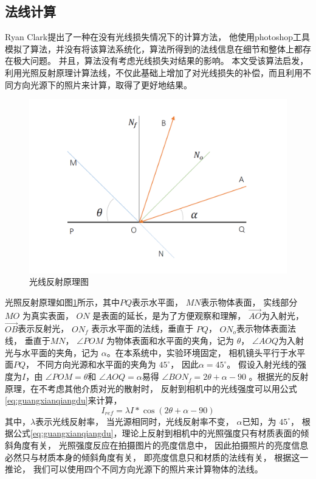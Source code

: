 \subsection{法线计算}


 Ryan Clark\cite{zarria.net}提出了一种在没有光线损失情况下的计算方法，
 他使用photoshop工具模拟了算法，并没有将该算法系统化，算法所得到的法线信息在细节和整体上都存在极大问题。
 并且，算法没有考虑光线损失对结果的影响。
 本文受该算法启发，利用光照反射原理计算法线，不仅此基础上增加了对光线损失的补偿，而且利用不同方向光源下的照片来计算，取得了更好地结果。

\begin{figure}[htbp]
\centering
\includegraphics[width=0.8\linewidth]{figures/guangxianfanshetu.png}
\caption{光线反射原理图}
\label{fig:guangxianfanshetu}
\end{figure}

光照反射原理如图\ref{fig:guangxianfanshetu}所示，其中$PQ$表示水平面，
$MN$表示物体表面，
实线部分$MO$
为真实表面，
$ON$
是表面的延长，是为了方便观察和理解，
$\overrightarrow{AO}$为入射光，
$\overrightarrow{OB}$表示反射光，
$ON_f$
表示水平面的法线，垂直于
$PQ$，
$ON_o$表示物体表面法线，
垂直于$MN$，
$\angle POM$
为物体表面和水平面的夹角，记为
$\theta $，
$\angle AOQ$为入射光与水平面的夹角，记为
$\alpha$。在本系统中，实验环境固定，
相机镜头平行于水平面$PQ$，
不同方向光源和水平面的夹角为
$45^{\circ}$，
因此$\alpha=45^{\circ}$。
假设入射光线的强度为$I$，由
$\angle POM=\theta$和
$\angle AOQ=\alpha$易得
$\angle {BON}_f=2\theta+\alpha-90$
。根据光的反射原理，在不考虑其他介质对光的散射时，
反射到相机中的光线强度可以用公式\eqref{eq:guangxianqiangdu}来计算，
\begin{equation}
\label{eq:guangxianqiangdu}
I_{ref}=\lambda I* \cos (2\theta +\alpha-90)
\end{equation}
其中，$\lambda$表示光线反射率，
当光源相同时，光线反射率不变，
$\alpha$已知，为
$45^{\circ}$，
根据公式\eqref{eq:guangxianqiangdu}，理论上反射到相机中的光照强度只有材质表面的倾斜角度有关，
光照强度反应在拍摄图片的亮度信息中，
因此拍摄照片的亮度信息必然只与材质本身的倾斜角度有关，
即亮度信息只和材质的法线有关，
根据这一推论，
我们可以使用四个不同方向光源下的照片来计算物体的法线。

